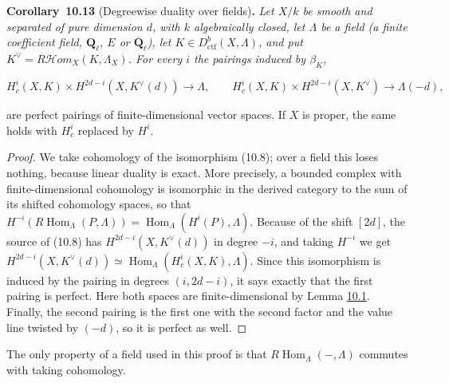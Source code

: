 \documentclass[11pt]{article}
\newenvironment{bpstatement}[2]{\par\addvspace{0.6\baselineskip}\noindent\textbf{#1}#2\textbf{.}\enspace\ignorespaces}
  {\par\addvspace{0.4\baselineskip}}
\newenvironment{bpstatementit}[2]{\begin{bpstatement}{#1}{#2}\itshape\ignorespaces}{\end{bpstatement}}
\providecommand{\Hom}{}\renewcommand{\Hom}{\operatorname{Hom}}
\providecommand{\cHom}{}\renewcommand{\cHom}{R\mathcal{H}\!om}
\begin{document}
\label{bp40}%
\begin{bpstatementit}{Corollary~10.13}{ (Degreewise duality over fields)}
Let \(X/k\) be smooth and separated of pure dimension \(d\), with \(k\) algebraically closed, let \(\Lambda\) be a field (a finite coefficient field, \(\mathbf Q_\ell\), \(E\) or \(\overline{\mathbf Q}_\ell\)), let \(K\in D^b_{\mathrm{ctf}}(X,\Lambda)\), and put \(K^\vee=\cHom_X(K,\Lambda_X)\). For every \(i\) the pairings induced by \(\beta_K\),

\[
H_c^i(X,K)\times H^{2d-i}(X,K^\vee(d))\longrightarrow\Lambda,
\qquad
H_c^i(X,K)\times H^{2d-i}(X,K^\vee)\longrightarrow\Lambda(-d),
\]

are perfect pairings of finite-dimensional vector spaces. If \(X\) is proper, the same holds with \(H_c^i\) replaced by \(H^i\).
\end{bpstatementit}

\begin{proof}[{Proof}]\label{bp41}%
We take cohomology of the isomorphism (10.8); over a field this loses nothing, because linear duality is exact. More precisely, a bounded complex with finite-dimensional cohomology is isomorphic in the derived category to the sum of its shifted cohomology spaces, so that \(H^{-i}(R\!\operatorname{Hom}_\Lambda(P,\Lambda))=\Hom_\Lambda(H^i(P),
\Lambda)\). Because of the shift \([2d]\), the source of (10.8) has \(H^{2d-i}(X,K^\vee(d))\) in degree \(-i\), and taking \(H^{-i}\) we get \(H^{2d-i}(X,K^\vee(d))\simeq\Hom_\Lambda(H^i_c(X,K),\Lambda)\). Since this isomorphism is induced by the pairing in degrees \((i,2d-i)\), it says exactly that the first pairing is perfect. Here both spaces are finite-dimensional by Lemma \hyperref[bp5]{10.1}. Finally, the second pairing is the first one with the second factor and the value line twisted by \((-d)\), so it is perfect as well.
\end{proof}

\label{bp42}%
The only property of a field used in this proof is that \(R\!\operatorname{Hom}_\Lambda(-,\Lambda)\) commutes with taking cohomology.
\end{document}
